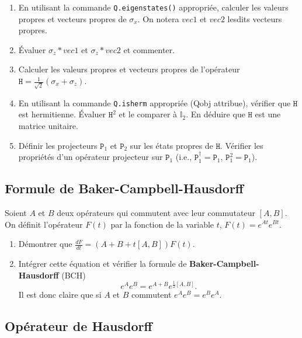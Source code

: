 \begin{enumerate}
\item En utilisant la commande \texttt{Q.eigenstates()} appropriée, calculer
les
valeurs propres et vecteurs propres de $\sigma_x$. On notera $vec1$ et $vec2$
lesdits vecteurs propres.

\item Évaluer $\sigma_z*vec1$ et $\sigma_z*vec2$ et commenter.

\item Calculer les valeurs propres et vecteurs propres de l'opérateur
$\mathtt{H} = \frac{1}{\sqrt{2}} (\sigma_x+\sigma_z)$.

\item En utilisant  la commande \texttt{Q.isherm} appropriée (Qobj attribue),
vérifier que $\mathtt{H}$ est hermitienne. Évaluer $\mathtt{H}^2$ et le
comparer à $\mathbb{I}_2$. En déduire que $\mathtt{H}$ est une matrice unitaire.

\item Définir les projecteurs $\mathtt{P}_1$ et $\mathtt{P}_2$ sur les états
propres de $\mathtt{H}$. Vérifier les propriétés d'un opérateur projecteur sur
$\mathtt{P}_1$ (i.e., $\mathtt{P}_1^{\dag}=\mathtt{P}_1$,
$\mathtt{P}_1^2=\mathtt{P}_1$).
\end{enumerate}

\subsection{Formule de Baker-Campbell-Hausdorff}

\label{sec:BCH1} Soient $A$ et $B$ deux opérateurs qui commutent avec leur
commutateur $[A,B]$. On définit l'opérateur $F(t)$ par la fonction de la
variable $t$, $F(t)=e^{At}e^{Bt}$.

\begin{enumerate}
\item Démontrer que $\frac{dF}{dt}=(A+B+t[A,B])F(t)$.

\item Intégrer cette équation et vérifier la formule de
\textbf{Baker-Campbell-Hausdorff}  (BCH)
\begin{equation}
e^{A}e^{B}=e^{A+B}e^{\frac{1}{2}[A,B]}.
\end{equation}
Il est donc claire que si $A$ et $B$ commutent $e^{A}e^{B}=e^{B}e^{A}$.
\end{enumerate}

\subsection{Opérateur de Hausdorff}

